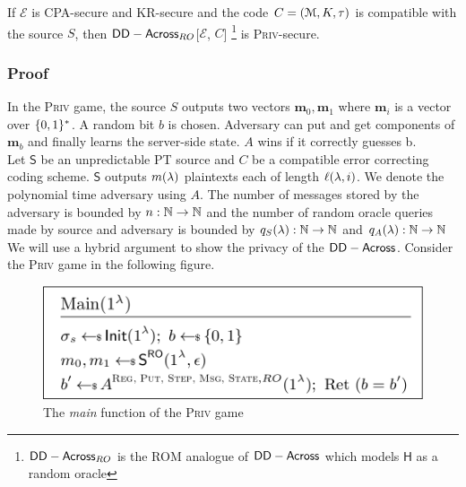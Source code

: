 \begin{theorem}
	If $\mathcal{E}$ is CPA-secure and KR-secure and the code $C=(\mathcal{M}, K, \tau)$ is compatible with the source $S$, then $\mathsf{DD-Across}_{RO}$[$\mathcal{E}$, $C$] \footnote{$\mathsf{DD-Across}_{RO}$ is the ROM analogue of $\mathsf{DD-Across}$ which models $\mathsf{H}$ as a random oracle} is \textsc{Priv}-secure.
\end{theorem}

\subsubsection*{Proof}
In the \textsc{Priv} game, the source $S$ outputs two vectors $\textbf{m}_0, \textbf{m}_1$ where $\textbf{m}_i$ is a vector over $\{0,1\}^*$. A random bit $b$ is chosen. Adversary can put and get components of $\textbf{m}_b$ and finally learns the server-side state. $A$ wins if it correctly guesses b.\\

Let $\mathsf{S}$ be an unpredictable PT source and $C$ be a compatible error correcting coding scheme. $\mathsf{S}$ outputs $m(\lambda)$ plaintexts each of length $\ell(\lambda, i)$. We denote the polynomial time adversary using $A$. The number of messages stored by the adversary is bounded by $n: \mathbb{N} \rightarrow \mathbb{N}$ and the number of random oracle queries made by source and adversary is bounded by $q_S(\lambda): \mathbb{N} \rightarrow \mathbb{N} $ and $q_A(\lambda): \mathbb{N} \rightarrow \mathbb{N} $
\\ 
We will use a hybrid argument to show the privacy of the $\mathsf{DD-Across}$. Consider the \textsc{Priv} game in the following figure.\\
\begin{figure}[H]
	\centering
	\includegraphics[scale=0.25]{Priv_game}
	\caption{The \textit{main} function of the \textsc{Priv} game}
\end{figure}

